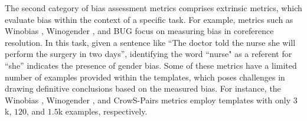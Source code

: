 \documentclass[letterpaper]{article} %
\begin{document}
The second category of bias assessment metrics comprises extrinsic metrics, which evaluate bias within the context of a specific task. For example, metrics such as Winobias \cite{zhao-etal-2018-gender}, Winogender \cite{rudinger2018gender}, and BUG \cite{levy2021collecting} focus on measuring bias in coreference resolution. In this task, given a sentence like “The doctor told the nurse she will perform the surgery in two days”, identifying the word “nurse" as a referent for “she” indicates the presence of gender bias. Some of these metrics have a limited number of examples provided within the templates, which poses challenges in drawing definitive conclusions based on the measured bias. For instance, the Winobias \cite{zhao-etal-2018-gender}, Winogender \cite{rudinger2018gender}, and CrowS-Pairs \cite{nangia2020crows} metrics employ templates with only  $3$k, $120$, and $1.5$k examples, respectively.

\end{document}
